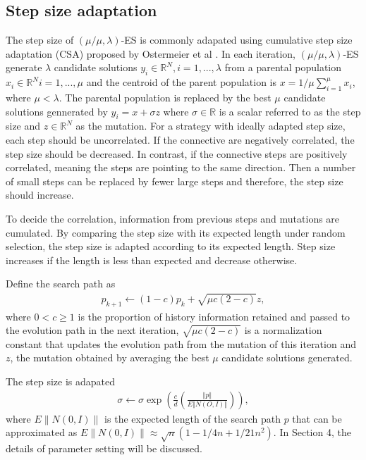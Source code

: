\subsection{Step size adaptation}

The step size of $(\mu/\mu,\lambda)$-ES is commonly adapated using cumulative step size adaptation (CSA) proposed by Ostermeier et al \cite{Ostermeier:1994:DAS:1326675.1326679}. In each iteration, $(\mu/\mu,\lambda)$-ES generate $\lambda$ candidate solutions $y_i \in \mathbb{R}^N,i=1,...,\lambda$ from a parental population $x_i \in \mathbb{R}^N i=1,...,\mu$ and the centroid of the parent population is $x = 1/\mu \sum_{i=1}^\mu x_i$, where $\mu < \lambda$. The parental population is replaced by the best $\mu$ candidate solutions gennerated by $y_i = x + \sigma z$ where $\sigma \in \mathbb{R}$ is a scalar referred to as the step size and $z \in \mathbb{R}^N$ as the mutation. For a strategy with ideally adapted step size, each step should be uncorrelated. If the connective are negatively correlated, the step size should be decreased. In contrast, if the connective steps are positively correlated, meaning the steps are pointing to the same direction. Then a number of small steps can be replaced by fewer large steps and therefore, the step size should increase. 

To decide the correlation, information from previous steps and mutations are cumulated. By comparing the step size with its expected length under random selection, the step size is adapted according to its expected length. Step size increases if the length is less than expected and decrease otherwise. 

Define the search path as 
\begin{align}
p_{k+1} \leftarrow (1-c)p_k + \sqrt{\mu c (2-c)} z,
\end{align}
where $0<c \geq 1$ is the proportion of history information retained and passed to the evolution path in the next iteration, $ \sqrt{\mu c (2-c)}$ is a normalization constant that updates the evolution path from the mutation of this iteration and $z$, the mutation obtained by averaging the best $\mu$ candidate solutions generated. 

The step size is adapated 
\begin{align}
\sigma \leftarrow \sigma \exp \left (  \frac{c}{d}  \left( \frac{\Vert p\Vert}{E \Vert N(O,I)\Vert } \right) \right ),
\end{align}
where $E\| N(0,I) \|$ is the expected length of the search path $p$ that can be approximated as $E\| N(0,I) \| \approx \sqrt{n} (1-1/4n + 1/21n^2)$. In Section 4, the details of parameter setting will be discussed.

